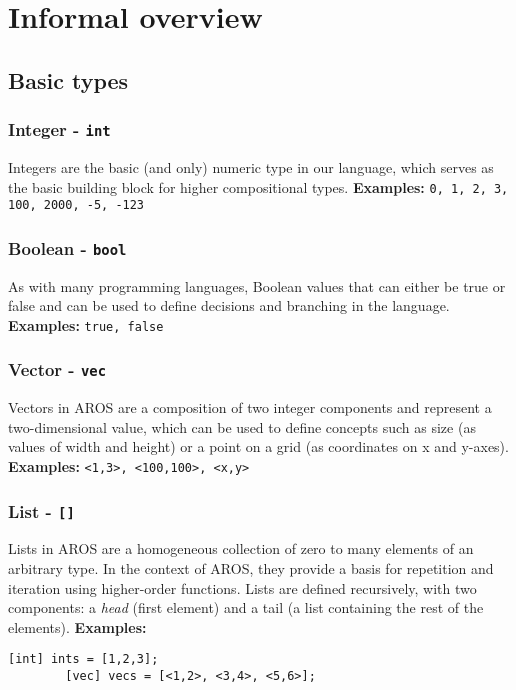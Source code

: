 \section{Informal overview}

\subsection{Basic types}

\subsubsection{Integer - \lstinline{int}}
    Integers are the basic (and only) numeric type in our language, which serves as the basic building block for higher compositional types.
    \newline \textbf{Examples:} \lstinline{0, 1, 2, 3, 100, 2000, -5, -123}
    
\subsubsection{Boolean - \lstinline{bool}}
    As with many programming languages, Boolean values that can either be true or false and can be used to define decisions and branching in the language.
    \newline \textbf{Examples:} \lstinline{true, false}

\subsubsection{Vector - \lstinline{vec}}
    Vectors in AROS are a composition of two integer components and represent a two-dimensional value, which can be used to define concepts such as size (as values of width and height) or a point on a grid (as coordinates on x and y-axes). 
    \newline \textbf{Examples:} \lstinline{<1,3>, <100,100>, <x,y>}

\subsubsection{List - \lstinline{[]}}
    Lists in AROS are a homogeneous collection of zero to many elements of an arbitrary type. In the context of AROS, they provide a basis for repetition and iteration using higher-order functions. Lists are defined recursively, with two components: a \textit{head} (first element) and a tail (a list containing the rest of the elements).
    \newline \textbf{Examples:}
    \begin{lstlisting}[language=aros,caption=List type examples]
        [int] ints = [1,2,3];
        [vec] vecs = [<1,2>, <3,4>, <5,6>];
    \end{lstlisting}

